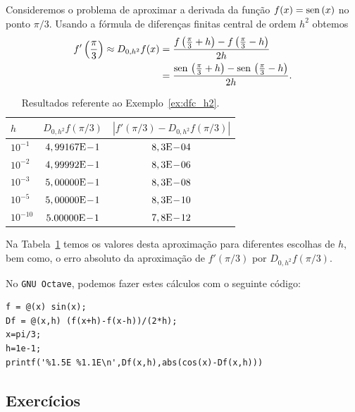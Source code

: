 \begin{ex}\label{ex:dfc_h2}
  Consideremos o problema de aproximar a derivada da função $f(x) = \operatorname{sen}\,(x)$ no ponto $\pi/3$. Usando a fórmula de diferenças finitas central de ordem $h^2$ obtemos
  \begin{align}
    f'\left(\frac{\pi}{3}\right) \approx D_{0,h^2}f(x) &= \frac{f\left(\frac{\pi}{3}+h\right)-f\left(\frac{\pi}{3}-h\right)}{2h}\\
          &= \frac{\operatorname{sen}\,\left(\frac{\pi}{3}+h\right)-\operatorname{sen}\,\left(\frac{\pi}{3}-h\right)}{2h}. 
  \end{align}

\begin{table}[h!]
  \centering
  \caption{Resultados referente ao Exemplo~\ref{ex:dfc_h2}.}
  \begin{tabular}{l|c|c}
    $h$ & $D_{0,h^2}f(\pi/3)$ & $|f'(\pi/3)-D_{0,h^2}f(\pi/3)|$\\ \hline
    $10^{-1}$ & $4,99167\mathrm{E}\!-\!1$ & $8,3\mathrm{E}\!-\!04$ \\
    $10^{-2}$ & $4,99992\mathrm{E}\!-\!1$ & $8,3\mathrm{E}\!-\!06$ \\
    $10^{-3}$ & $5,00000\mathrm{E}\!-\!1$ & $8,3\mathrm{E}\!-\!08$ \\
    $10^{-5}$ & $5,00000\mathrm{E}\!-\!1$ & $8,3\mathrm{E}\!-\!10$ \\
    $10^{-10}$ & $5.00000\mathrm{E}\!-\!1$ & $7,8\mathrm{E}\!-\!12$ \\\hline
  \end{tabular}
  \label{tab:ex_dfc_h2}
\end{table}

Na Tabela~\ref{tab:ex_dfc_h2} temos os valores desta aproximação para diferentes escolhas de $h$, bem como, o erro absoluto da aproximação de $f'(\pi/3)$ por $D_{0,h^2}f(\pi/3)$.

No \verb+GNU Octave+, podemos fazer estes cálculos com o seguinte código:
\begin{verbatim}
f = @(x) sin(x);
Df = @(x,h) (f(x+h)-f(x-h))/(2*h);
x=pi/3;
h=1e-1;
printf('%1.5E %1.1E\n',Df(x,h),abs(cos(x)-Df(x,h)))
\end{verbatim}
\end{ex}


\subsection*{Exercícios}

